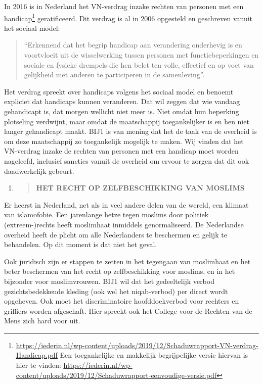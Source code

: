 In 2016 is in Nederland het VN-verdrag inzake rechten van personen met
een handicap\footnote{\href{https://iederin.nl/wp-content/uploads/2019/12/Schaduwrapport-VN-verdrag-Handicap.pdf}{\underline{https://iederin.nl/wp-content/uploads/2019/12/Schaduwrapport-VN-verdrag-Handicap.pdf}}
  Een toegankelijke en makkelijk begrijpelijke versie hiervan is hier te
  vinden:
  \href{https://iederin.nl/wp-content/uploads/2019/12/Schaduwrapport-eenvoudige-versie.pdf}{\underline{https://iederin.nl/wp-content/uploads/2019/12/Schaduwrapport-eenvoudige-versie.pdf}}}
geratificeerd. Dit verdrag is al in 2006 opgesteld en geschreven vanuit
het sociaal model:

\begin{quote}
``Erkennend dat het begrip handicap aan verandering onderhevig is en
voortvloeit uit de wisselwerking tussen personen met functiebeperkingen
en sociale en fysieke drempels die hen belet ten volle, effectief en op
voet van gelijkheid met anderen te participeren in de samenleving''.
\end{quote}

Het verdrag spreekt over handicaps volgens het sociaal model en benoemt
expliciet dat handicaps kunnen veranderen. Dat wil zeggen dat wie
vandaag gehandicapt is, dat morgen wellicht niet meer is. Niet omdat hun
beperking plotseling verdwijnt, maar omdat de maatschappij
toegankelijker is en hen niet langer gehandicapt maakt. BIJ1 is van
mening dat het de taak van de overheid is om deze maatschappij zo
toegankelijk mogelijk te maken. Wij vinden dat het VN-verdrag inzake de
rechten van personen met een handicap moet worden nageleefd, inclusief
sancties vanuit de overheid om ervoor te zorgen dat dit ook
daadwerkelijk gebeurt.

\begin{enumerate}
\def\labelenumi{\arabic{enumi}.}
\setcounter{enumi}{12}
\item
  \begin{quote}
  \textbf{HET RECHT OP ZELFBESCHIKKING VAN MOSLIMS}
  \end{quote}
\end{enumerate}

Er heerst in Nederland, net als in veel andere delen van de wereld, een
klimaat van islamofobie. Een jarenlange hetze tegen moslims door
politiek (extreem-)rechts heeft moslimhaat inmiddels genormaliseerd. De
Nederlandse overheid heeft de plicht om alle Nederlanders te beschermen
en gelijk te behandelen. Op dit moment is dat niet het geval.

Ook juridisch zijn er stappen te zetten in het tegengaan van moslimhaat
en het beter beschermen van het recht op zelfbeschikking voor moslims,
en in het bijzonder voor moslimvrouwen. BIJ1 wil dat het gedeeltelijk
verbod gezichtsbedekkende kleding (ook wel het niqab-verbod) per direct
wordt opgeheven. Ook moet het discriminatoire hoofddoekverbod voor
rechters en griffiers worden afgeschaft. Hier spreekt ook het College
voor de Rechten van de Mens zich hard voor uit.

